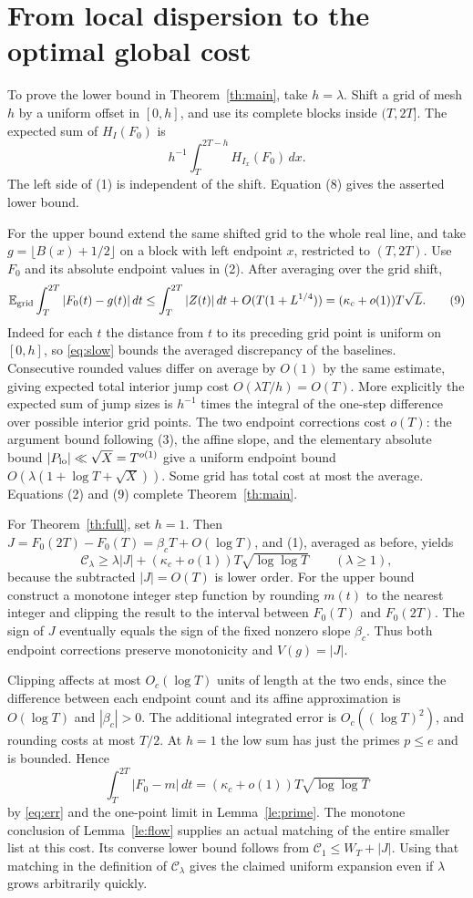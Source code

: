 \documentclass[11pt]{article}
\newcommand{\E}{\mathbb E}
\newcommand{\cost}{\mathcal C}
\begin{document}
\section{From local dispersion to the optimal global cost}
To prove the lower bound in Theorem~\ref{th:main}, take $h=\lambda$. Shift a grid of mesh $h$ by a uniform offset in $[0,h]$, and use its complete blocks inside $(T,2T]$. The expected sum of $H_I(F_0)$ is
\[
 h^{-1}\int_T^{2T-h}H_{I_x}(F_0)\,dx.
\]
The left side of (1) is independent of the shift. Equation (8) gives the asserted lower bound.

For the upper bound extend the same shifted grid to the whole real line, and take
$g=\lfloor B(x)+1/2\rfloor$ on a block with left endpoint $x$, restricted to $(T,2T)$. Use $F_0$ and its absolute endpoint values in (2). After averaging over the grid shift,
\[
 \E_{\rm grid}\int_T^{2T}|F_0(t)-g(t)|\,dt
 \le \int_T^{2T} |Z(t)|\,dt+O(T(1+L^{1/4}))
 =(\kappa_c+o(1))T\sqrt L.                                         \tag{9}
\]
Indeed for each $t$ the distance from $t$ to its preceding grid point is uniform on $[0,h]$, so \eqref{eq:slow} bounds the averaged discrepancy of the baselines. Consecutive rounded values differ on average by $O(1)$ by the same estimate, giving expected total interior jump cost $O(\lambda T/h)=O(T)$. More explicitly the expected sum of jump sizes is $h^{-1}$ times the integral of the one-step difference over possible interior grid points. The two endpoint corrections cost $o(T)$: the argument bound following (3), the affine slope, and the elementary absolute bound $|P_{\rm lo}|\ll\sqrt X=T^{o(1)}$ give a uniform endpoint bound $O(\lambda(1+\log T+\sqrt X))$. Some grid has total cost at most the average. Equations (2) and (9) complete Theorem~\ref{th:main}.

For Theorem~\ref{th:full}, set $h=1$. Then $J=F_0(2T)-F_0(T)=\beta_c T+O(\log T)$, and (1), averaged as before, yields
\[
 \cost_\lambda\ge\lambda|J|+(\kappa_c+o(1))T\sqrt{\log\log T}
 \qquad(\lambda\ge1),
\]
because the subtracted $|J|=O(T)$ is lower order. For the upper bound construct a monotone integer step function by rounding $m(t)$ to the nearest integer and clipping the result to the interval between $F_0(T)$ and $F_0(2T)$. The sign of $J$ eventually equals the sign of the fixed nonzero slope $\beta_c$. Thus both endpoint corrections preserve monotonicity and $V(g)=|J|$.

Clipping affects at most $O_c(\log T)$ units of length at the two ends, since the difference between each endpoint count and its affine approximation is $O(\log T)$ and $|\beta_c|>0$. The additional integrated error is $O_c((\log T)^2)$, and rounding costs at most $T/2$. At $h=1$ the low sum has just the primes $p\le e$ and is bounded. Hence
\[
 \int_T^{2T}|F_0-m|\,dt
   =(\kappa_c+o(1))T\sqrt{\log\log T}
\]
by \eqref{eq:err} and the one-point limit in Lemma~\ref{le:prime}. The monotone conclusion of Lemma~\ref{le:flow} supplies an actual matching of the entire smaller list at this cost. Its converse lower bound follows from $\cost_1\le W_T+|J|$. Using that matching in the definition of $\cost_\lambda$ gives the claimed uniform expansion even if $\lambda$ grows arbitrarily quickly.
\end{document}
